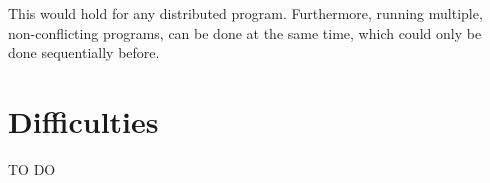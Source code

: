 \documentclass{article}
\begin{document}
This would hold for any distributed program. Furthermore, running multiple, non-conflicting programs, can be done at the same time, which could only be done sequentially before.


\section{Difficulties}
 TO DO

\end{document}
